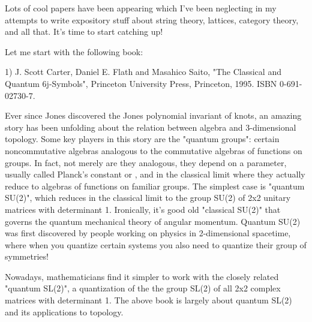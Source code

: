 

Lots of cool papers have been appearing which I've been neglecting
in my attempts to write expository stuff about string theory, lattices,
category theory, and all that.  It's time to start catching up!

Let me start with the following book:

1) J. Scott Carter, Daniel E. Flath and Masahico Saito,
"The Classical and Quantum 6j-Symbols", Princeton University
Press, Princeton, 1995.  ISBN 0-691-02730-7.

Ever since Jones discovered the Jones polynomial invariant of knots,
an amazing story has been unfolding about the relation between algebra
and 3-dimensional topology.  Some key players in this story are the 
"quantum groups": certain noncommutative algebras analogous to the 
commutative algebras of functions on groups.   In fact, not merely
are they analogous, they depend on a parameter, usually called
Planck's constant or \hbar , and in the classical limit where \hbar  {}
they actually reduce to algebras of functions on familiar groups.  The 
simplest case is "quantum SU(2)", which reduces in the classical
limit to the group SU(2) of 2x2 unitary matrices with determinant 1.
Ironically, it's good old "classical SU(2)" that governs the quantum 
mechanical theory of angular momentum.   Quantum SU(2) was first 
discovered by people working on physics in 2-dimensional spacetime,
where when you quantize certain systems you also need to quantize their
group of symmetries!  

Nowadays, mathematicians find it simpler to work with the closely 
related "quantum SL(2)", a quantization of the the group SL(2) 
of all 2x2 complex matrices with determinant 1.  The above book is 
largely about quantum SL(2) and its applications to topology.



